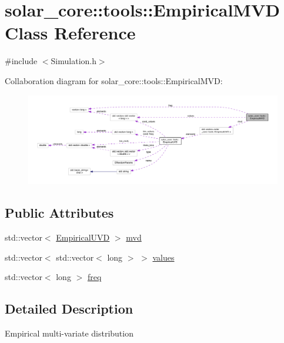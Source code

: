 \hypertarget{classsolar__core_1_1tools_1_1_empirical_m_v_d}{}\section{solar\+\_\+core\+:\+:tools\+:\+:Empirical\+M\+V\+D Class Reference}
\label{classsolar__core_1_1tools_1_1_empirical_m_v_d}


{\ttfamily \#include $<$Simulation.\+h$>$}



Collaboration diagram for solar\+\_\+core\+:\+:tools\+:\+:Empirical\+M\+V\+D\+:
\nopagebreak
\begin{figure}[H]
\begin{center}
\leavevmode
\includegraphics[width=350pt]{classsolar__core_1_1tools_1_1_empirical_m_v_d__coll__graph}
\end{center}
\end{figure}
\subsection*{Public Attributes}
\begin{DoxyCompactItemize}
\item 
std\+::vector$<$ \hyperlink{classsolar__core_1_1tools_1_1_empirical_u_v_d}{Empirical\+U\+V\+D} $>$ \hyperlink{classsolar__core_1_1tools_1_1_empirical_m_v_d_aa83e37773da6c4f70e2c7218b439ef21}{mvd}
\item 
std\+::vector$<$ std\+::vector$<$ long $>$ $>$ \hyperlink{classsolar__core_1_1tools_1_1_empirical_m_v_d_ac5fe45bde609ac9cc2dd6d3e7121ce48}{values}
\item 
std\+::vector$<$ long $>$ \hyperlink{classsolar__core_1_1tools_1_1_empirical_m_v_d_a637f45117b7ed5d52beac351440c3805}{freq}
\end{DoxyCompactItemize}


\subsection{Detailed Description}
Empirical multi-\/variate distribution 

